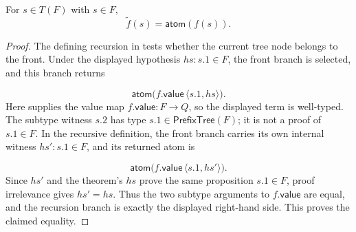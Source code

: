 \begin{lemma}
For $s\in T(F)$ with $s\in F$,
\[
  \widetilde f(s)=\mathsf{atom}(f(s)).
\]
\end{lemma}
\begin{proof}
The defining recursion in  tests whether the current tree
node belongs to the front.  Under the displayed hypothesis $hs:s.1\in F$,
the front branch is selected, and this branch returns

\[
  \mathsf{atom}\bigl(f.\mathsf{value}\,\langle s.1,hs\rangle\bigr).
\]
Here  supplies the value map
$f.\mathsf{value}:F\to Q$, so the displayed term is well-typed.  The
subtype witness $s.2$ has type $s.1\in\mathsf{PrefixTree}(F)$; it is not a
proof of $s.1\in F$.  In the recursive definition, the front branch carries
its own internal witness $hs':s.1\in F$, and its returned atom is

\[
  \mathsf{atom}\bigl(f.\mathsf{value}\,\langle s.1,hs'\rangle\bigr).
\]
Since $hs'$ and the theorem's $hs$ prove the same proposition
$s.1\in F$, proof irrelevance gives $hs'=hs$.  Thus the two subtype
arguments to $f.\mathsf{value}$ are equal, and the recursion branch is exactly
the displayed right-hand side.  This proves the claimed equality.
\end{proof}
